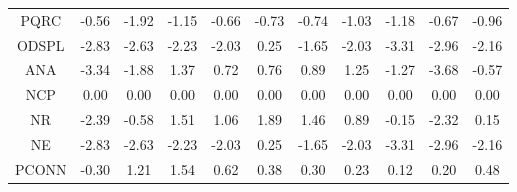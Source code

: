 \begin{longtable}{ | c || c | c | c | c | c | c | c | c | c || c |}
PQRC &  \cellcolor[HTML]{FFEFEF} -0.56 &  \cellcolor[HTML]{FFCFCF} -1.92 &  \cellcolor[HTML]{FFDFDF} -1.15 &  \cellcolor[HTML]{FFEFEF} -0.66 &  \cellcolor[HTML]{FFEFEF} -0.73 &  \cellcolor[HTML]{FFEFEF} -0.74 &  \cellcolor[HTML]{FFE7E7} -1.03 &  \cellcolor[HTML]{FFDFDF} -1.18 &  \cellcolor[HTML]{FFEFEF} -0.67 &  \cellcolor[HTML]{FFE7E7} -0.96 \\
ODSPL &  \cellcolor[HTML]{FFB7B7} -2.83 &  \cellcolor[HTML]{FFBFBF} -2.63 &  \cellcolor[HTML]{FFC7C7} -2.23 &  \cellcolor[HTML]{FFCFCF} -2.03 &  \cellcolor[HTML]{F7F7FF} 0.25 &  \cellcolor[HTML]{FFD7D7} -1.65 &  \cellcolor[HTML]{FFCFCF} -2.03 &  \cellcolor[HTML]{FFAFAF} -3.31 &  \cellcolor[HTML]{FFB7B7} -2.96 &  \cellcolor[HTML]{FFC7C7} -2.16 \\
ANA &  \cellcolor[HTML]{FFA7A7} -3.34 &  \cellcolor[HTML]{FFCFCF} -1.88 &  \cellcolor[HTML]{DFDFFF} 1.37 &  \cellcolor[HTML]{EFEFFF} 0.72 &  \cellcolor[HTML]{EFEFFF} 0.76 &  \cellcolor[HTML]{E7E7FF} 0.89 &  \cellcolor[HTML]{DFDFFF} 1.25 &  \cellcolor[HTML]{FFDFDF} -1.27 &  \cellcolor[HTML]{FF9F9F} -3.68 &  \cellcolor[HTML]{FFEFEF} -0.57 \\
NCP &  \cellcolor[HTML]{FFFFFF} 0.00 &  \cellcolor[HTML]{FFFFFF} 0.00 &  \cellcolor[HTML]{FFFFFF} 0.00 &  \cellcolor[HTML]{FFFFFF} 0.00 &  \cellcolor[HTML]{FFFFFF} 0.00 &  \cellcolor[HTML]{FFFFFF} 0.00 &  \cellcolor[HTML]{FFFFFF} 0.00 &  \cellcolor[HTML]{FFFFFF} 0.00 &  \cellcolor[HTML]{FFFFFF} 0.00 &  \cellcolor[HTML]{FFFFFF} 0.00 \\
NR &  \cellcolor[HTML]{FFBFBF} -2.39 &  \cellcolor[HTML]{FFEFEF} -0.58 &  \cellcolor[HTML]{D7D7FF} 1.51 &  \cellcolor[HTML]{E7E7FF} 1.06 &  \cellcolor[HTML]{CFCFFF} 1.89 &  \cellcolor[HTML]{D7D7FF} 1.46 &  \cellcolor[HTML]{E7E7FF} 0.89 &  \cellcolor[HTML]{FFFFFF} -0.15 &  \cellcolor[HTML]{FFC7C7} -2.32 &  \cellcolor[HTML]{FFFFFF} 0.15 \\
NE &  \cellcolor[HTML]{FFB7B7} -2.83 &  \cellcolor[HTML]{FFBFBF} -2.63 &  \cellcolor[HTML]{FFC7C7} -2.23 &  \cellcolor[HTML]{FFCFCF} -2.03 &  \cellcolor[HTML]{F7F7FF} 0.25 &  \cellcolor[HTML]{FFD7D7} -1.65 &  \cellcolor[HTML]{FFCFCF} -2.03 &  \cellcolor[HTML]{FFAFAF} -3.31 &  \cellcolor[HTML]{FFB7B7} -2.96 &  \cellcolor[HTML]{FFC7C7} -2.16 \\
PCONN &  \cellcolor[HTML]{FFF7F7} -0.30 &  \cellcolor[HTML]{DFDFFF} 1.21 &  \cellcolor[HTML]{D7D7FF} 1.54 &  \cellcolor[HTML]{EFEFFF} 0.62 &  \cellcolor[HTML]{F7F7FF} 0.38 &  \cellcolor[HTML]{F7F7FF} 0.30 &  \cellcolor[HTML]{F7F7FF} 0.23 &  \cellcolor[HTML]{FFFFFF} 0.12 &  \cellcolor[HTML]{F7F7FF} 0.20 &  \cellcolor[HTML]{EFEFFF} 0.48 \\

\end{longtable}
